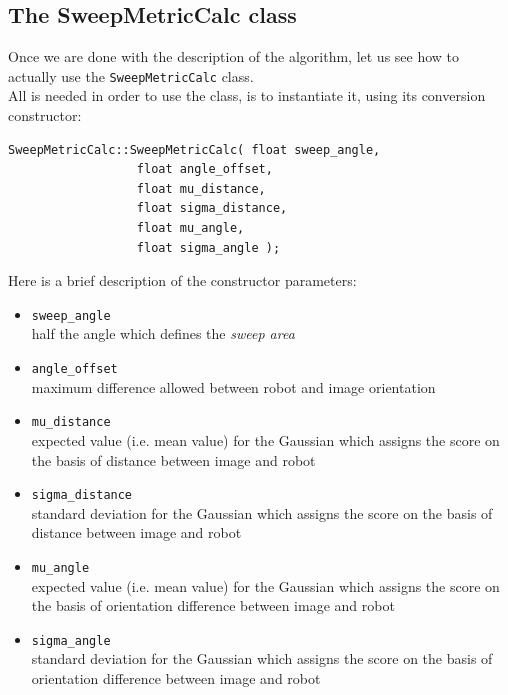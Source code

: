 \subsection{The SweepMetricCalc class}
\label{concr:iimageselector:sweep_metric_class}

Once we are done with the description of the algorithm, 
let us see how to actually use the \texttt{SweepMetricCalc} 
class. 
\\
All is needed in order to use the class, is to instantiate it,
using its conversion constructor:

\begin{lstlisting}[caption={\texttt{SweepMetricCalc} class declaration}, label={code:sweepmetriccalc}, frame=trBL]
SweepMetricCalc::SweepMetricCalc( float sweep_angle,
				  float angle_offset,
				  float mu_distance,
				  float sigma_distance,
				  float mu_angle,
				  float sigma_angle );				  
\end{lstlisting}

Here is a brief description of the constructor parameters:

\begin{itemize}
  \item \texttt{sweep\_angle} \\
    half the angle which defines the \textit{sweep area}
  \item \texttt{angle\_offset} \\
    maximum difference allowed between robot and 
    image orientation 
  \item \texttt{mu\_distance} \\
    expected value (i.e. mean value) for the Gaussian 
    which assigns the score on the basis of distance between
    image and robot
  \item \texttt{sigma\_distance} \\
    standard deviation for the Gaussian which assigns the 
    score on the basis of distance between image and robot
  \item \texttt{mu\_angle} \\
    expected value (i.e. mean value) for the Gaussian which 
    assigns the score on the basis of orientation difference
    between image and robot
  \item \texttt{sigma\_angle} \\
    standard deviation for the Gaussian which assigns the 
    score on the basis of orientation difference between image
    and robot
\end{itemize}


